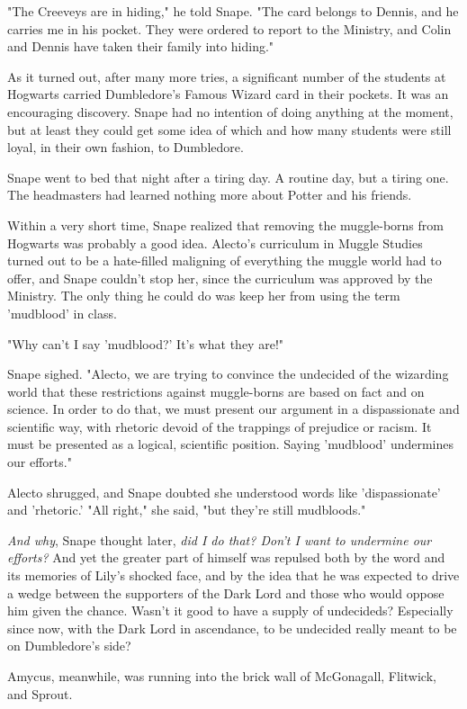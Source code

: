 \documentclass[a4paper,11pt]{article}
\begin{document}
"The Creeveys are in hiding," he told Snape. "The card belongs to Dennis, and he carries me in his pocket. They were ordered to report to the Ministry, and Colin and Dennis have taken their family into hiding."

As it turned out, after many more tries, a significant number of the students at Hogwarts carried Dumbledore's Famous Wizard card in their pockets. It was an encouraging discovery. Snape had no intention of doing anything at the moment, but at least they could get some idea of which and how many students were still loyal, in their own fashion, to Dumbledore.

Snape went to bed that night after a tiring day. A routine day, but a tiring one. The headmasters had learned nothing more about Potter and his friends.

Within a very short time, Snape realized that removing the muggle-borns from Hogwarts was probably a good idea. Alecto's curriculum in Muggle Studies turned out to be a hate-filled maligning of everything the muggle world had to offer, and Snape couldn't stop her, since the curriculum was approved by the Ministry. The only thing he could do was keep her from using the term 'mudblood' in class.

"Why can't I say 'mudblood?' It's what they are!"

Snape sighed. "Alecto, we are trying to convince the undecided of the wizarding world that these restrictions against muggle-borns are based on fact and on science. In order to do that, we must present our argument in a dispassionate and scientific way, with rhetoric devoid of the trappings of prejudice or racism. It must be presented as a logical, scientific position. Saying 'mudblood' undermines our efforts."

Alecto shrugged, and Snape doubted she understood words like 'dispassionate' and 'rhetoric.' "All right," she said, "but they're still mudbloods."

\emph{And why}, Snape thought later, \emph{did I do that? Don't I want to undermine our efforts?} And yet the greater part of himself was repulsed both by the word and its memories of Lily's shocked face, and by the idea that he was expected to drive a wedge between the supporters of the Dark Lord and those who would oppose him given the chance. Wasn't it good to have a supply of undecideds? Especially since now, with the Dark Lord in ascendance, to be undecided really meant to be on Dumbledore's side?

Amycus, meanwhile, was running into the brick wall of McGonagall, Flitwick, and Sprout.
\end{document}
